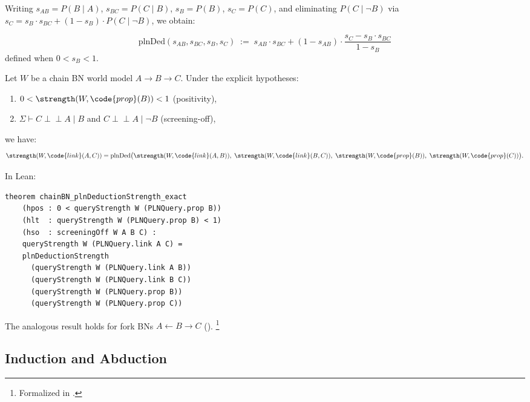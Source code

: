 \documentclass[11pt,openany]{report}
\begin{document}
Writing $s_{AB} = P(B \mid A)$, $s_{BC} = P(C \mid B)$, $s_B = P(B)$,
$s_C = P(C)$, and eliminating $P(C \mid \lnot B)$ via
$s_C = s_B \cdot s_{BC} + (1 - s_B) \cdot P(C \mid \lnot B)$, we obtain:

\begin{definition}
\label{def:deduction-strength}
\[
  \mathrm{plnDed}(s_{AB}, s_{BC}, s_B, s_C) \;:=\;
  s_{AB} \cdot s_{BC} + (1 - s_{AB}) \cdot \frac{s_C - s_B \cdot s_{BC}}{1 - s_B}
\]
defined when $0 < s_B < 1$.
\end{definition}

\begin{theorem}
\label{thm:chain-deduction}
Let $W$ be a chain BN world model $A \to B \to C$.  Under the explicit
hypotheses:
\begin{enumerate}
\item[(i)] $0 < \strength(W, \code{prop}(B)) < 1$ \quad (positivity),
\item[(ii)] $\Sigma \vdash C \perp\!\!\!\perp A \mid B$ and
  $C \perp\!\!\!\perp A \mid \lnot B$ \quad (screening-off),
\end{enumerate}
we have:
\[
  \strength(W, \code{link}(A, C)) = \mathrm{plnDed}\big(
    \strength(W, \code{link}(A, B)),\;
    \strength(W, \code{link}(B, C)),\;
    \strength(W, \code{prop}(B)),\;
    \strength(W, \code{prop}(C))
  \big).
\]
\end{theorem}

In Lean:
\begin{lstlisting}
theorem chainBN_plnDeductionStrength_exact
    (hpos : 0 < queryStrength W (PLNQuery.prop B))
    (hlt  : queryStrength W (PLNQuery.prop B) < 1)
    (hso  : screeningOff W A B C) :
    queryStrength W (PLNQuery.link A C) =
    plnDeductionStrength
      (queryStrength W (PLNQuery.link A B))
      (queryStrength W (PLNQuery.link B C))
      (queryStrength W (PLNQuery.prop B))
      (queryStrength W (PLNQuery.prop C))
\end{lstlisting}

The analogous result holds for fork BNs $A \leftarrow B \to C$
().%
\footnote{Formalized in .}

\subsection{Induction and Abduction}
\end{document}
